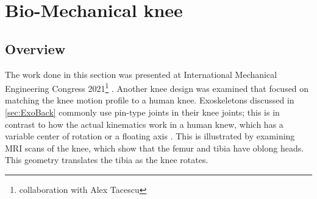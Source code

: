 \section{Bio-Mechanical knee}

\subsection{Overview}


The work done in this section was presented at International Mechanical Engineering Congress 2021\footnote{collaboration with Alex Tacescu} \cite{tacescu2021design} \cite{tacescu2021development} .
Another knee design was examined that focused on matching the knee motion profile to a human knee. Exoskeletons discussed in \autoref{sec:ExoBack} commonly use pin-type joints in their knee joints; this is in contrast to how the actual kinematics work in a human knew, which has a variable center of rotation or a floating axis \cite{morrison1970mechanics} \cite{koo2008knee} \cite{grood1983joint}. This is illustrated by examining MRI scans of the knee, which show that the femur and tibia have oblong heads\cite{MRIKneeScan}. This geometry translates the tibia as the knee rotates. 




